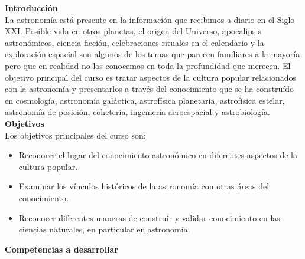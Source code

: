 \documentclass[letterpaper,10pt,onecolumn]{article}
\begin{document}
\noindent\textbf{\large {} \quad
  Introducci\'on}\\[-0.2cm] 


\noindent\normalsize 
La astronom\'ia est\'a presente en la informaci\'on que
recibimos a diario en el Siglo XXI. Posible vida en otros planetas, el
origen del  Universo, apocalipsis astron\'omicos, ciencia ficci\'on,
celebraciones rituales en el calendario y la exploraci\'on espacial
son algunos de los temas que parecen familiares a la mayor\'ia pero que
en realidad no los conocemos en toda la profundidad que merecen. El
objetivo principal del curso es tratar aspectos de la cultura popular
relacionados con la astronom\'ia y presentarlos a trav\'es del
conocimiento que se ha constru\'ido en cosmolog\'ia, astronom\'ia
gal\'actica, astrof\'isica planetaria, astrof\'isica estelar,
astronom\'ia de posici\'on, coheter\'ia, ingenier\'ia aeroespacial y
astrobiolog\'ia. \\[0.1cm]  

\noindent\textbf{\large {} \quad Objetivos}\\[-0.2cm]


\noindent\normalsize Los objetivos principales del curso son:

\begin{itemize}
\item Reconocer el lugar del conocimiento astron\'omico en diferentes
  aspectos de la cultura popular. \\[-0.6cm] 

\item Examinar los v\'inculos hist\'oricos de la astronom\'ia con
  otras \'areas del conocimiento.  \\[-0.6cm] 

\item Reconocer diferentes maneras de construir y validar conocimiento
  en las ciencias naturales, en particular en astronom\'ia.\\[-0.2cm]
\end{itemize}

\noindent\textbf{\large {} \quad Competencias a
  desarrollar}\\[-0.2cm] 
\end{document}
